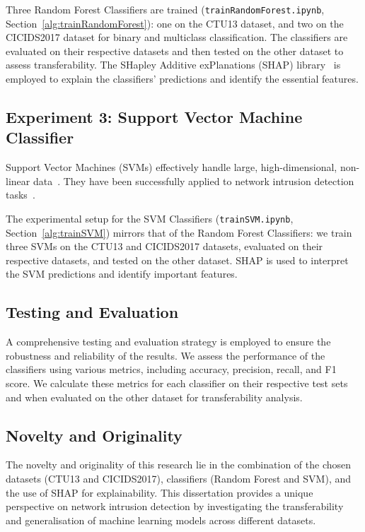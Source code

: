 Three Random Forest Classifiers are trained (\texttt{trainRandomForest.ipynb}, Section~\ref{alg:trainRandomForest}): one on the CTU13 dataset, and two on the CICIDS2017 dataset for binary and multiclass classification. The classifiers are evaluated on their respective datasets and then tested on the other dataset to assess transferability. The SHapley Additive exPlanations (SHAP) library~\cite{lundberg2017unified} is employed to explain the classifiers' predictions and identify the essential features.

\subsection{Experiment 3: Support Vector Machine Classifier}\label{subsec:support-vector-machine-classifier}
Support Vector Machines (SVMs) effectively handle large, high-dimensional, non-linear data~\cite{cortes1995support, scholkopf2002learning}. They have been successfully applied to network intrusion detection tasks~\cite{kim2003network, teng2017svm}.

The experimental setup for the SVM Classifiers (\texttt{trainSVM.ipynb}, Section~\ref{alg:trainSVM}) mirrors that of the Random Forest Classifiers: we train three SVMs on the CTU13 and CICIDS2017 datasets, evaluated on their respective datasets, and tested on the other dataset. SHAP is used to interpret the SVM predictions and identify important features.

\subsection{Testing and Evaluation}\label{subsec:testing-evaluation}
A comprehensive testing and evaluation strategy is employed to ensure the robustness and reliability of the results. We assess the performance of the classifiers using various metrics, including accuracy, precision, recall, and F1 score. We calculate these metrics for each classifier on their respective test sets and when evaluated on the other dataset for transferability analysis.

\subsection{Novelty and Originality}\label{subsec:novelty-originality}
The novelty and originality of this research lie in the combination of the chosen datasets (CTU13 and CICIDS2017), classifiers (Random Forest and SVM), and the use of SHAP for explainability. This dissertation provides a unique perspective on network intrusion detection by investigating the transferability and generalisation of machine learning models across different datasets.

